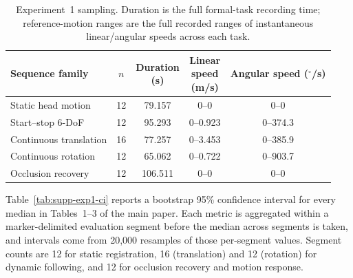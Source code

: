 \documentclass[review]{vgtc}
\begin{document}
\begin{table}[t]
\centering
\caption{Experiment~1 sampling. Duration is the full formal-task recording time;
reference-motion ranges are the full recorded ranges of instantaneous linear/angular
speeds across each task.}\label{tab:supp-exp1-sampling}
\begin{tabular}{@{}lcccc@{}}
\toprule
Sequence family & $n$ & \makecell{Duration\\(s)} & \makecell{Linear\\speed\\(m/s)} & \makecell{Angular\\speed\\($^\circ$/s)} \\
\midrule
Static head motion & 12 & 79.157 & 0--0 & 0--0 \\
Start--stop 6-DoF & 12 & 95.293 & 0--0.923 & 0--374.3 \\
Continuous translation & 16 & 77.257 & 0--3.453 & 0--385.9 \\
Continuous rotation & 12 & 65.062 & 0--0.722 & 0--903.7 \\
Occlusion recovery & 12 & 106.511 & 0--0 & 0--0 \\
\bottomrule
\end{tabular}
\end{table}

Table~\ref{tab:supp-exp1-ci} reports a bootstrap 95\% confidence interval for every
median in Tables~1--3 of the main paper. Each metric is aggregated within a
marker-delimited evaluation segment before the median across segments is taken, and
intervals come from 20{,}000 resamples of those per-segment values. Segment counts
are 12 for static registration, 16 (translation) and 12 (rotation) for dynamic
following, and 12 for occlusion recovery and motion response.
\end{document}
